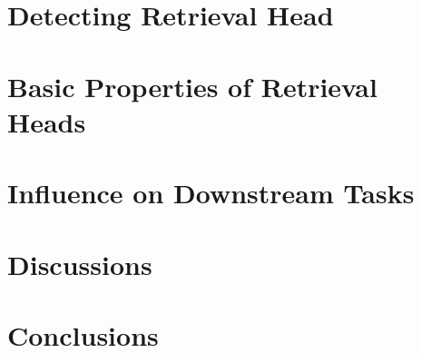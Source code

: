 \documentclass{article}
\begin{document}
% 


\section{Detecting Retrieval Head}
\label{sec:retrieval_head}



\section{Basic Properties of Retrieval Heads}
\label{sec:properties}


\section{Influence on Downstream Tasks}
\label{sec:downstream_tasks}


% 

\section{Discussions}
\label{sec:discussions}


\section{Conclusions}
\label{sec:conclusions}





\end{document}

